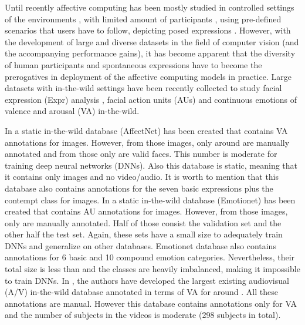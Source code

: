 \documentclass{bmvc2k}
\begin{document}
Until recently affective computing has been mostly studied in controlled settings of the environments \cite{gross2010multi,lucey2010extended,tian2001recognizing,yin20063d,yin2008high}, with limited amount of participants \cite{pantic2005web,valstar2010induced,lyons1998japanese,ringeval2013introducing,bilakhia2015mahnob}, using pre-defined scenarios that users have to follow, depicting posed expressions \cite{aifanti2010mug,mckeown2011semaine}. 
However, with the development of large and diverse datasets in the field of computer vision (and the accompanying performance gains), it has become apparent that the diversity of human participants and spontaneous expressions have to become the prerogatives in deployment of the affective computing models in practice. 
Large datasets with in-the-wild settings have been recently collected  to study facial expression (Expr) analysis \cite{dalgleish2000handbook,cowie2003describing}, facial action units (AUs) \cite{ekman2002facial} and continuous emotions of valence and arousal (VA) \cite{whissel1989dictionary,russell1978evidence} in-the-wild. 

In \cite{mollahosseini2017affectnet} a static in-the-wild database (AffectNet) has been created that contains VA annotations for  images. However, from those images, only around  are manually annotated and from those only  are valid faces. This number is moderate for training deep neural networks (DNNs). Also this database is static, meaning that it contains only images and no video/audio. It is worth to mention that this database also contains annotations for the seven basic expressions plus the contempt class for  images.
In \cite{emotionet2016} a static in-the-wild database (Emotionet) has been created that contains AU annotations for  images. However, from those images, only  are manually annotated. Half of those consist the validation set and the other half the test set. Again, these sets have a small size to adequately train DNNs and generalize on other databases. Emotionet database also contains annotations for 6 basic and 10 compound emotion categories. Nevertheless, their total size is less than  and the classes are heavily imbalanced, making it impossible to train DNNs.
In \cite{kollias2019deep,zafeiriou2017aff}, the authors have developed the largest existing audiovisual (A/V) in-the-wild database annotated in terms of VA for around . All these annotations are manual. However this database contains annotations only for VA and the number of subjects in the videos is moderate (298 subjects in total).
\end{document}
